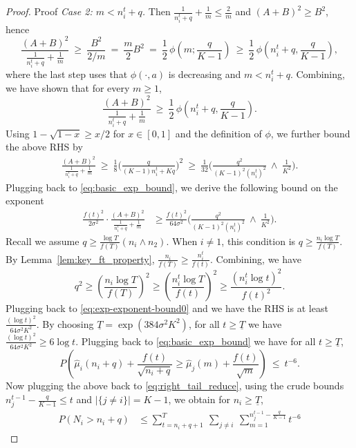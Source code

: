 \documentclass[nonblindrev]{informs3_noinforms}
\begin{document}
\begin{proof}{Proof}
\emph{Case 2: $m<n_i^t + q$.} Then $\frac{1}{n_i^t + q}+\frac{1}{m}\le \frac{2}{m}$ and $(A+B)^2\ge B^2$, hence
\[
\frac{(A+B)^2}{\frac{1}{n_i^t + q}+\frac{1}{m}}
\ \ge\ \frac{B^2}{2/m}
\ =\ \frac{m}{2}B^2
\ =\ \frac12\,\phi\left(m;\frac{q}{K-1}\right)
\ \ge\ \frac12\,\phi\left(n_i^t + q, \frac{q}{K-1}\right),
\]
where the last step uses that $\phi(\cdot, a)$ is decreasing and $m<n_i^t +q$. Combining, we have shown that for every $m \ge 1$, 
\begin{equation*}
\frac{(A+B)^2}{\frac{1}{n_i^t + q}+\frac{1}{m}}
\ \ge\ \frac{1}{2}\,\phi\left(n_i^t + q, \frac{q}{K-1} \right).
\end{equation*}
Using $1-\sqrt{1-x}\ge x/2$ for $x\in[0,1]$ and the definition of $\phi$, we further bound the above RHS by
\begin{align*}
    \frac{(A+B)^2}{\frac{1}{n_i^t + q}+\frac{1}{m}}
\ \ge\ \frac{1}{8}\Big(\frac{q}{(K-1)n_i^t+Kq}\Big)^2 \ \ge \ \frac{1}{32}\Big(\frac{q^2}{(K-1)^2(n_i^t)^2}\ \wedge\ \frac{1}{K^2}\Big).
\end{align*}
Plugging back to \eqref{eq:basic_exp_bound}, we derive the following bound on the exponent
\begin{align}\label{eq:exp-exponent-bound0}
  \frac{f(t)^2}{2\sigma^2}\cdot \frac{(A + B)^2}{\frac{1}{n_i^t + q} + \frac{1}{m}} & \ge \frac{f(t)^2}{64\sigma^2} \Big(\frac{q^2}{(K-1)^2(n_i^t)^2}\ \wedge\ \frac{1}{K^2}\Big).
\end{align}
Recall we assume $q \ge \frac{\log T}{f(T)}\left(n_i \wedge n_2\right).$ When $i \ne 1$, this condition is $q \ge \frac{n_i \log T}{f(T)}.$ By Lemma~\ref{lem:key_ft_property}, $\frac{n_i}{f(T)} \ge \frac{n_i^t}{f(t)}$. Combining, we have 
\[
q^2 \ge \left(\frac{n_i \log T}{f(T)}\right)^2 \ge \left( \frac{n_i^t \log T}{f(t)}\right)^2 \ge \frac{(n_i^t \log t)^2}{f(t)^2}.
\]
Plugging back to \eqref{eq:exp-exponent-bound0} and we have the RHS is at least $\frac{(\log t)^2}{64\sigma^2 K^2}$. By choosing $\underline{T} = \exp\left(384 \sigma^2 K^2\right)$, for all $t \ge \underline{T}$ we have $\frac{(\log t)^2}{64\sigma^2 K^2}  \ge 6 \log t$. Plugging back to \eqref{eq:basic_exp_bound} we have for all $t \ge \underline{T}$, 
\[
P\!\left(
\widehat\mu_i(n_i+q)+\frac{f(t)}{\sqrt{n_i+q}}
\ge
\widehat\mu_j(m)+\frac{f(t)}{\sqrt{m}}
\right)
\ \le\ t^{-6}.
\]
Now plugging the above back to \eqref{eq:right_tail_reduce}, using the crude bounds
$n_j^{t-1}-\frac{q}{K-1} \le t$ and $|\{j\neq i\}|=K-1$, we obtain for $n_i \ge \underline{T}$,
\begin{align*}
P(N_i > n_i+q)
&\le \sum_{t=n_i+q +1}^{T}\ \sum_{j\neq i}\ \sum_{m=1}^{n_j^{t-1}-\frac{q}{K-1}} t^{-6}

\end{align*}
\end{proof}
\end{document}
